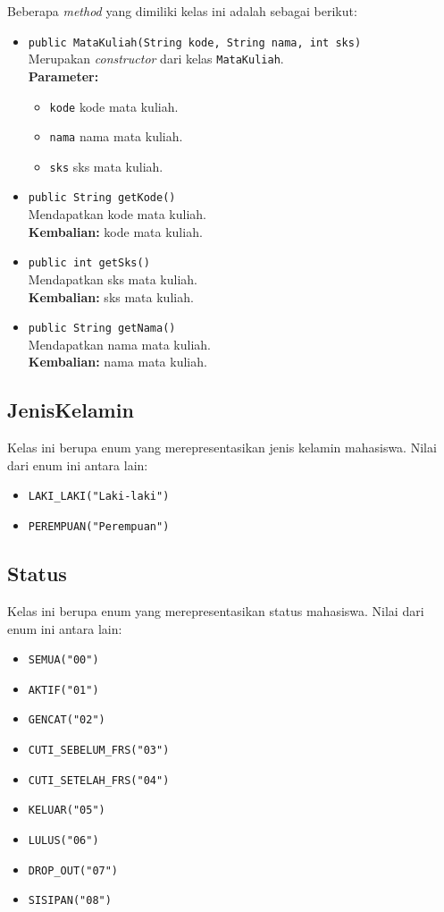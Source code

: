 Beberapa \textit{method} yang dimiliki kelas ini adalah sebagai berikut:
\begin{itemize}
	\item \texttt{public MataKuliah(String kode, String nama, int sks)}\\
	Merupakan \textit{constructor} dari kelas \texttt{MataKuliah}.\\
	\textbf{Parameter:}
	\begin{itemize}
		\item \texttt{kode} kode mata kuliah.
		\item \texttt{nama} nama mata kuliah.
		\item \texttt{sks} sks mata kuliah.
	\end{itemize}
	
	\item \texttt{public String getKode()} \\
	Mendapatkan kode mata kuliah. \\
	\textbf{Kembalian:} kode mata kuliah.
	
	\item \texttt{public int getSks()} \\
	Mendapatkan sks mata kuliah. \\
	\textbf{Kembalian:} sks mata kuliah.
	
	\item \texttt{public String getNama()} \\
	Mendapatkan nama mata kuliah. \\
	\textbf{Kembalian:} nama mata kuliah.
\end{itemize}


\subsection{JenisKelamin}
Kelas ini berupa enum yang merepresentasikan jenis kelamin mahasiswa. Nilai dari enum ini antara lain:
\begin{itemize}
	\item \texttt{LAKI\_LAKI("Laki-laki")} 
	\item \texttt{PEREMPUAN("Perempuan")}
\end{itemize}


\subsection{Status}
Kelas ini berupa enum yang merepresentasikan status mahasiswa. Nilai dari enum ini antara lain:
\begin{itemize}
	\item \texttt{SEMUA("00")} 
	\item \texttt{AKTIF("01")} 
	\item \texttt{GENCAT("02")} 
	\item \texttt{CUTI\_SEBELUM\_FRS("03")} 
	\item \texttt{CUTI\_SETELAH\_FRS("04")} 
	\item \texttt{KELUAR("05")} 
	\item \texttt{LULUS("06")} 
	\item \texttt{DROP\_OUT("07")} 
	\item \texttt{SISIPAN("08")} 
\end{itemize}
